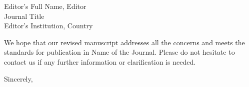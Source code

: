 \documentclass{letter}
\newcommand{\EditorName}{Editor's Full Name}
\newcommand{\EditorAffiliation}{Editor\\Journal Title\\Editor's Institution, Country}
\newcommand{\JournalName}{Name of the Journal}
\begin{document}
\begin{letter}{\EditorName, \EditorAffiliation}
\begin{enumerate}[label=2.\arabic*]


\end{enumerate}

\vspace{0.5cm}
We hope that our revised manuscript addresses all the concerns and meets the standards for publication in \JournalName. Please do not hesitate to contact us if any further information or clarification is needed.

\closing{Sincerely,}

\end{letter}
\end{document}
